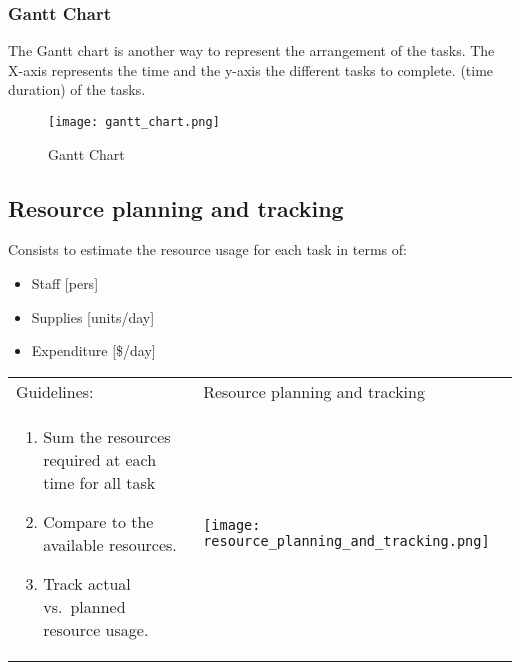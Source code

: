 \subsubsection{Gantt Chart}

The Gantt chart is another way to represent the arrangement of the
tasks. The X-axis represents the time and the y-axis the different tasks
to complete. (time duration) of the tasks.

\begin{figure}[!ht]
    \centering
    \texttt{[image: gantt\_chart.png]}
    \caption{Gantt Chart}
\end{figure}
\FloatBarrier{}


\subsection{Resource planning and tracking}

Consists to estimate the resource usage for each task in terms of:
\begin{itemize}
    \item Staff [pers]
    \item Supplies [units/day]
    \item Expenditure [\$/day]
\end{itemize}

\begin{tabular}{m{8cm}m{9cm}}
    Guidelines: & Resource planning and tracking \\
\begin{enumerate}
 \item Sum the resources required at each time for all task
 \item Compare to the available resources.
 \item Track actual vs.\ planned resource usage.
\end{enumerate}
&
    \texttt{[image: resource\_planning\_and\_tracking.png]}
    \end{tabular}
